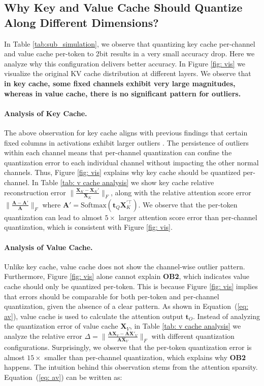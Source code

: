 \subsection{Why Key and Value Cache Should Quantize Along Different Dimensions?}
\label{sec: analysis} In Table \ref{tab:sub_simulation}, we observe that quantizing key cache per-channel and value cache per-token to 2bit results in a very small accuracy drop. Here we analyze why this configuration delivers better accuracy. In Figure \ref{fig: vis} we visualize the original KV cache distribution at different layers. We observe that \textbf{in key cache, some fixed channels exhibit very large magnitudes, whereas in value cache, there is no significant pattern for outliers.}

\paragraph{Analysis of Key Cache.} The above observation for key cache aligns with previous findings that certain fixed columns in activations exhibit larger outliers \citep{llmint8, lin2023awq}. The persistence of outliers within each channel means that per-channel quantization can confine the quantization error to each individual channel without impacting the other normal channels. Thus, Figure \ref{fig: vis} explains why key cache should be quantized per-channel. In Table \ref{tab: v cache analysis} we show key cache relative reconstruction error $\|\frac{{\bm{X}}_K-{\bm{X}}_K'}{{\bm{X}}_K}\|_F$, along with the relative attention score error $\|\frac{{\bm{A}}-{\bm{A}}'}{{\bm{A}}}\|_F$ where ${\bm{A}}'=\text{Softmax}({\bm{t}}_Q{\bm{X}}^{'\top}_K)$. 
We observe that the per-token quantization can lead to almost $5\times$ larger attention score error than per-channel quantization, which is consistent with Figure \ref{fig: vis}.

\paragraph{Analysis of Value Cache.} Unlike key cache, value cache does not show the channel-wise outlier pattern. Furthermore, Figure \ref{fig: vis} alone cannot explain \textbf{OB2}, which indicates value cache should only be quantized per-token. This is because Figure \ref{fig: vis} implies that errors should be comparable for both per-token and per-channel quantization, given the absence of a clear pattern. As shown in Equation~(\ref{eq: av}), value cache is used to calculate the attention output ${\bm{t}}_O$.
Instead of analyzing the quantization error of value cache ${\bm{X}}_V$, in Table \ref{tab: v cache analysis} we analyze the relative error $\Delta=\|\frac{{\bm{A}}{\bm{X}}_V-{\bm{A}} {\bm{X}}'_V}{{\bm{A}}{\bm{X}}_V}\|_F$ with different quantization configurations. Surprisingly, we observe that the per-token quantization error is almost $15\times$ smaller than per-channel quantization, which explains why \textbf{OB2} happens. The intuition behind this observation stems from the attention sparsity.
Equation~(\ref{eq: av}) can be written as:

